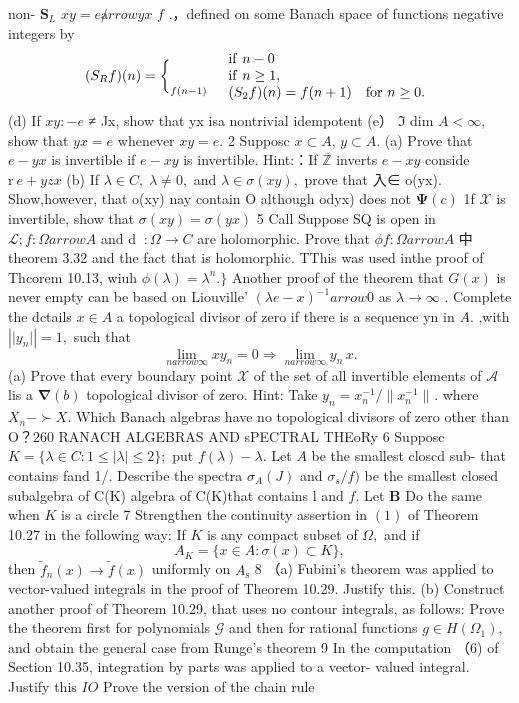 non- ${\boldsymbol{S}}_{L}$ $x y=e\not arrow y x$ $\boldsymbol{\mathit{f}}$ .，defined on some Banach space of functions negative integers by $$ (S_{R}f)(n)={\biggl\{}_{f(n-1)}\quad{\begin{array}{l l}{{\mathrm{if~}}n-0}\\ {{\mathrm{if~}}n\geq1,}\\ {{(S_{2}f)(n)=f(n+1)}}&{{\mathrm{for~}n\geq0.}}\end{array}}\, $$ (d) If $x y\colon-e$ ≠ Jx, show that yx isa nontrivial idempotent (e） ${\mathfrak{I}}$ dim $A<\infty,$ show that $y x=e$ whenever $x y=e.$ 2 Supposc $x\subset A,\,y\subset A.$ (a) Prove that $e-y x$ is invertible if $e-x y$ is invertible. Hint:：If $\overline{{\mathbb{Z}}}$ inverts $e-x y$ conside $\mathrm{r}\ e+y z x$ (b) If $\lambda\in C,\;\lambda\neq0,$ and $\lambda\in\sigma(x y),$ prove that 入∈ o(yx). Show,however, that o(xy) nay contain O although odyx) does not $\mathbf{\Psi}(c)$ 1f $\scriptstyle{\mathcal{X}}$ is invertible, show that $\sigma(x y)=\sigma(y x)$ 5 Call Suppose SQ is open in ${\mathcal{L}};f\colon\Omega arrow A$ and d $\ :\Omega\to C$ are holomorphic. Prove that $\phi f\colon\Omega arrow A$ 中 theorem 3.32 and the fact that is holomorphic. TThis was used inthe proof of Thcorem 10.13, wiuh $\phi(\lambda)=\lambda^{n}.\}$ Another proof of the theorem that $\scriptstyle{G(x)}$ is never empty can be based on Liouville' $(\lambda e-x)^{-1} arrow0$ as $\lambda\to\infty$ . Complete the dctails $x\in A$ a topological divisor of zero if there is a sequence {yn} in $A.$ ,with $|\vert y_{n}\vert|=1,$ such that $$ \operatorname*{lim}_{n arrow\infty}x y_{n}=0\Longrightarrow\operatorname*{lim}_{n arrow\infty}y_{n}\,x. $$ (a) Prove that every boundary point $\scriptstyle{\mathcal{X}}$ of the set of all invertible elements of $\textstyle{\mathcal{A}}$ lis a $\mathbf{\nabla}(b)$ topological divisor of zero. Hint: Take $y_{n}=x_{n}^{-1}/\|x_{n}^{-1}\|_{}.$ where $X_{n}-\succ X.$ Which Banach algebras have no topological divisors of zero other than O？260 RANACH ALGEBRAS AND sPECTRAL THEoRy 6 Supposc $K=\{\lambda\in C\colon1\leq|\lambda|\leq2\};$ put $f(\lambda)-\lambda.$ Let $\scriptstyle{A}$ be the smallest closcd sub- that contains fand 1/. Describe the spectra $\sigma_{A}(J)$ and $\sigma_{s}/f)$ be the smallest closed subalgebra of C(K) algebra of C(K)that contains l and $f.$ Let $\boldsymbol{B}$ Do the same when $\textstyle K$ is a circle 7 Strengthen the continuity assertion in $\operatorname{\left(1\right)}$ of Theorem 10.27 in the following way: If $\textstyle K$ is any compact subset of $\Omega,$ and if $$ A_{K}=\{x\in A\colon\sigma(x)\subset K\}, $$ then ${\tilde{f}}_{n}(x)\to{\tilde{f}}(x)$ uniformly on $\scriptstyle A_{\mathrm{s}}$ 8 （a) Fubini's theorem was applied to vector-valued integrals in the proof of Theorem 10.29. Justify this. (b) Construct another proof of Theorem 10.29, that uses no contour integrals, as follows: Prove the theorem first for polynomials $\scriptstyle{\mathcal{G}}$ and then for rational functions $g\in H(\Omega_{1}),$ and obtain the general case from Runge's theorem 9 In the computation （6) of Section 10.35, integration by parts was applied to a vector- valued integral. Justify this $I O$ Prove the version of the chain rule 